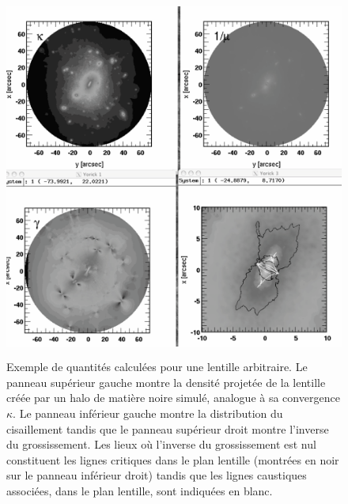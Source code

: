 \begin{figure}[htbp]
	\centering
		\includegraphics[height=12cm]{figs/SPLHALO.png}
	\caption[Les quantités pertinentes d'une lentille gravitationnelle]{Exemple de quantités calculées pour une lentille arbitraire. Le panneau supérieur gauche montre la densité projetée de la lentille créée par un halo de matière noire simulé, analogue à sa convergence $\kappa$. Le panneau inférieur gauche montre la distribution du cisaillement tandis que le panneau supérieur droit montre l'inverse du grossissement. Les lieux où l'inverse du grossissement est nul constituent les lignes critiques dans le plan lentille (montrées en noir sur le panneau inférieur droit) tandis que les lignes caustiques associées, dans le plan lentille, sont indiquées en blanc.} 
	\label{f:SPLHALO}
\end{figure}

